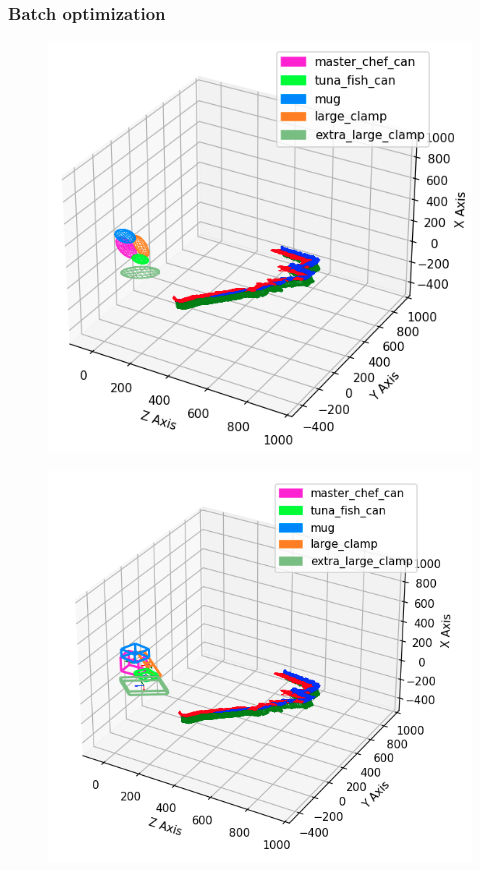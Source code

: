 \documentclass[report.tex]{subfiles}
\begin{document}
\subsubsection{Batch optimization}
\begin{itemize}
\begin{figure}[H]
\centering
\begin{minipage}{.45\textwidth}
  \centering
  \includegraphics[width=\textwidth]{Images/48_batch_complete.png}
  \label{fig:batch_48}
\end{minipage}%
\begin{minipage}{.45\textwidth}
  \centering
  \includegraphics[width=\textwidth]{Images/48_gt_traj_box.png}
  \label{fig:gt_48}
\end{minipage}
\end{figure}


\end{itemize}
\end{document}
